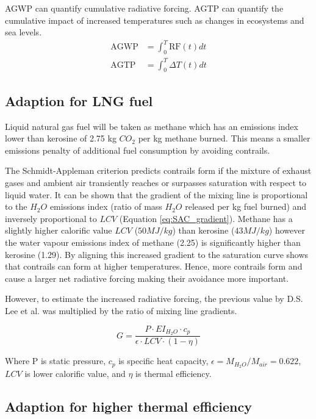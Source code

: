\documentclass{article}
\begin{document}

AGWP can quantify cumulative radiative forcing.
AGTP can quantify the cumulative impact of increased temperatures such as changes in ecosystems and sea levels.
\begin{align}
    \text{AGWP} &= \int_0^T \text{RF}(t) dt \\
    \text{AGTP} &= \int_0^T \Delta T(t) dt
\end{align}

\subsection{Adaption for LNG fuel}

Liquid natural gas fuel will be taken as methane which has an emissions index lower than kerosine
of 2.75 kg $CO_2$ per kg methane burned.
This means a smaller emissions penalty of additional fuel consumption by avoiding contrails.

The Schmidt-Appleman criterion predicts contrails form if the mixture of exhaust gases and ambient air
transiently reaches or surpasses saturation with respect to liquid water.
It can be shown that the gradient of the mixing line is proportional to the $H_2O$ emissions index (ratio of mass $H_2O$ released per kg fuel burned) and inversely proportional to $LCV$ (Equation \ref{eq:SAC_gradient}).
Methane has a slightly higher calorific value $LCV$ ($50MJ/kg$) than kerosine ($43MJ/kg$) however the water vapour emissions index of methane (2.25) is significantly higher than kerosine (1.29).
By aligning this increased gradient to the saturation curve shows that contrails can form at higher temperatures.
Hence, more contrails form and cause a larger net radiative forcing making their avoidance more important.

However, to estimate the increased radiative forcing, the previous value by D.S. Lee et al. was multiplied by the ratio
of mixing line gradients.

\begin{equation}
    G = \frac{P \cdot EI_{H_2O} \cdot c_p}{\epsilon \cdot LCV \cdot (1-\eta)} \label{eq:SAC_gradient}
\end{equation}

Where P is static pressure, $c_p$ is specific heat capacity, $\epsilon = M_{H_2O}/M_{air} = 0.622$, $LCV$ is lower calorific value, and $\eta$ is thermal efficiency.

\subsection{Adaption for higher thermal efficiency}
\end{document}
